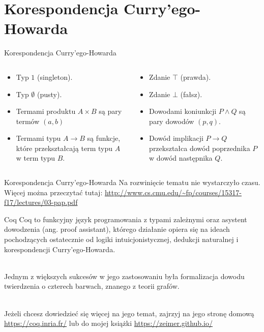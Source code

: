 \documentclass{beamer}
\newcommand{\impl}{\rightarrow}
\begin{document}
\section{Korespondencja Curry'ego-Howarda}

\begin{frame}{Korespondencja Curry'ego-Howarda}

\begin{columns}
\begin{column}{0.5\textwidth}
\begin{itemize}
	\item Typ $1$ (singleton).
	\item Typ $\emptyset$ (pusty).
	\item Termami produktu $A \times B$ są pary termów $(a, b)$
	\item Termami typu $A \to B$ są funkcje, które przekształcają term typu $A$ w term typu $B$.
\end{itemize}
\end{column}
\begin{column}{0.5\textwidth}
\begin{itemize}
	\item Zdanie $\top$ (prawda).
	\item Zdanie $\bot$ (fałsz).
	\item Dowodami koniunkcji $P \land Q$ są pary dowodów $(p, q)$.
	\item Dowód implikacji $P \impl Q$ przekształca dowód poprzednika $P$ w dowód następnika $Q$. 
\end{itemize}
\end{column}
\end{columns}
\end{frame}

\begin{frame}{Korespondencja Curry'ego-Howarda}
	Na rozwinięcie tematu nie wystarczyło czasu. Więcej można przeczytać tutaj: \url{http://www.cs.cmu.edu/~fp/courses/15317-f17/lectures/03-pap.pdf}
\end{frame}

\begin{frame}{Coq}
	Coq to funkcyjny język programowania z typami zależnymi oraz asystent dowodzenia (ang. proof assistant), którego działanie opiera się na ideach pochodzących ostatecznie od logiki intuicjonistycznej, dedukcji naturalnej i korespondencji Curry'ego-Howarda. \\~\
	
	Jednym z większych sukcesów w jego zastosowaniu była formalizacja dowodu twierdzenia o czterech barwach, znanego z teorii grafów. \\~\
	
	Jeżeli chcesz dowiedzieć się więcej na jego temat, zajrzyj na jego stronę domową \url{https://coq.inria.fr/} lub do mojej książki \url{https://zeimer.github.io/}
\end{frame}
\end{document}
